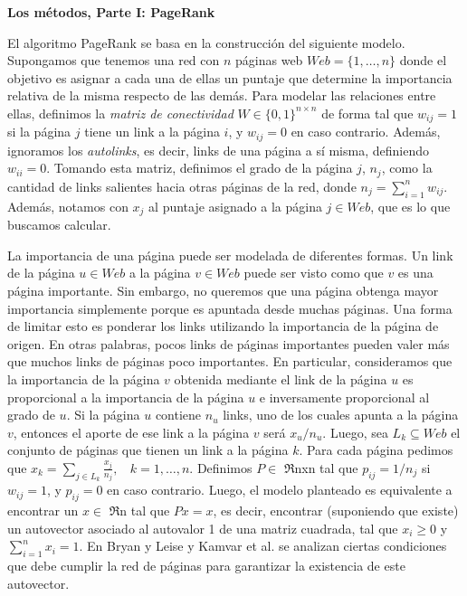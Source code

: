 \vskip 5pt
\noindent\textbf{Los m\'etodos, Parte I: PageRank}
\vskip 5pt

El algoritmo PageRank se basa en la construcci\'on del siguiente modelo. Supongamos que tenemos una red con $n$ p\'aginas 
web $Web = \{1,\dots,n\}$ donde
el objetivo es asignar a cada una de ellas un puntaje que determine la importancia relativa de la misma respecto de las
dem\'as. Para modelar las relaciones entre ellas, definimos la \emph{matriz de conectividad} $W \in \{0,1\}^{n \times n}$ 
de forma tal que $w_{ij} = 1$ si la p\'agina $j$ tiene un link a la p\'agina $i$, y $w_{ij} = 0$ en caso contrario. 
Adem\'as, ignoramos los \emph{autolinks}, es decir, links de una p\'agina a s\'i misma, definiendo $w_{ii} = 0$. Tomando 
esta matriz, definimos el grado de la p\'agina $j$, $n_j$, como la cantidad de links salientes hacia otras p\'aginas 
de la red, donde $n_j = \sum_{i = 1}^n w_{ij}$. Adem\'as, notamos con $x_j$ al puntaje asignado a la p\'agina $j\in
Web$, que es lo que buscamos calcular.

La importancia de una p\'agina puede ser modelada de diferentes formas. Un link de la p\'agina $u \in
Web$ a la p\'agina $v \in Web$ puede ser visto como que $v$ es una p\'agina importante. Sin embargo, no queremos que una
p\'agina obtenga mayor importancia simplemente porque es apuntada desde muchas p\'aginas. 
Una forma de limitar esto es ponderar los links utilizando la importancia de la p\'agina de origen. En otras palabras,
pocos links de p\'aginas importantes pueden valer m\'as que muchos links de p\'aginas poco importantes. En particular,
consideramos que la importancia de la p\'agina $v$ obtenida mediante el link de la p\'agina $u$ es proporcional a la 
importancia de la p\'agina $u$ e inversamente proporcional al grado de $u$. Si la p\'agina $u$ contiene $n_u$ links,
uno de los cuales apunta a la p\'agina $v$, entonces el aporte de ese link a la p\'agina $v$ ser\'a $x_u/n_u$. Luego,
sea $L_k \subseteq Web$ el conjunto de p\'aginas que tienen un link a la p\'agina $k$. Para cada p\'agina pedimos que
$x_k = \sum_{j \in L_k} \frac{x_j}{n_j},~~~~k = 1,\dots,n.$ %
Definimos $P \in$ $\Re$nxn tal que $p_{ij} = 1/n_j$ si $w_{ij} = 1$, y $p_{ij} = 0$ en caso contrario. Luego,
el modelo planteado es equivalente a encontrar un $x\in$ $\Re$n tal que $Px = x$, es
decir, encontrar (suponiendo que existe) un autovector asociado al autovalor 1 de una matriz cuadrada, tal que $x_i \ge
0$ y $\sum_{i = 1}^n x_i = 1$. En
Bryan y Leise \cite{Bryan2006} y Kamvar et al. \cite[Secci\'on 1]{Kamvar2003} se analizan ciertas condiciones que debe
cumplir la red de p\'aginas para garantizar la existencia de este autovector.

